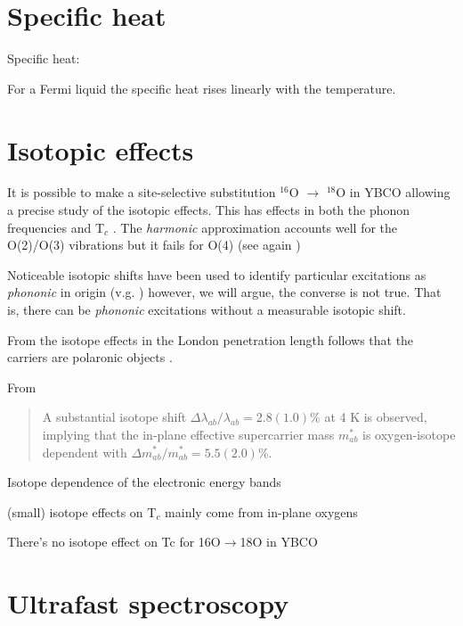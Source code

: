 \section{Specific heat}
\label{sec:specific_heat}

Specific heat: \cite{Loram1993}

For a Fermi liquid the specific heat rises linearly with the temperature.

\section{Isotopic effects}
\label{sec:isotopic_effects}

It is possible to make a site-selective substitution $^{16}$O $\rightarrow$ $^{18}$O in YBCO \cite{Conder1993} allowing a precise study of the isotopic effects. 
This has effects in both the phonon frequencies \cite{Ruani1994} and T$_{c}$ \cite{Zech1994,Cardona1988}. 
The \textit{harmonic} approximation accounts well for the O(2)/O(3) vibrations but it fails for O(4) (see again \cite{Ruani1994})

Noticeable isotopic shifts have been used to identify particular excitations as \textit{phononic} in origin (v.g. \cite{Thomsen1990}) however, we will argue, the converse is not true. 
That is, there can be \textit{phononic} excitations without a measurable isotopic shift.

From the isotope effects in the London penetration length follows that the carriers are polaronic objects \cite{Zhao1997}.

From \cite{Khasanov2004} \begin{quote}A substantial isotope shift $\Delta\lambda_{ab}/\lambda_{ab}=2.8(1.0)$\% at 4 K is observed, implying that the in-plane effective supercarrier mass $m^*_{ab}$ is oxygen-isotope dependent with $\Delta m^*_{ab} / m^*_{ab}=5.5(2.0)$\%.\end{quote}

Isotope dependence of the electronic energy bands \cite{Gweon2004}

(small) isotope effects on T$_c$ mainly come from in-plane oxygens \cite{Zech1994}

There's no isotope effect on Tc for 16O$\rightarrow$18O in YBCO \cite{Thomsen1988}

\section{Ultrafast spectroscopy}
\label{sec:ultrafast_spect}

